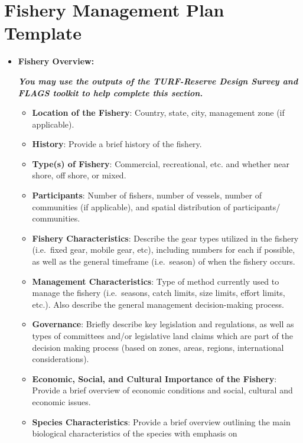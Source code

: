 \documentclass[]{book}
\begin{document}
\section{Fishery Management Plan
Template}\label{fishery-management-plan-template}

\begin{itemize}
\item
  \textbf{Fishery Overview:}

  \textbf{\emph{You may use the outputs of the TURF-Reserve Design
  Survey and FLAGS toolkit to help complete this section.}}

  \begin{itemize}
  \item
    \textbf{Location of the Fishery}: Country, state, city, management
    zone (if applicable).
  \item
    \textbf{History}: Provide a brief history of the fishery.
  \item
    \textbf{Type(s) of Fishery}: Commercial, recreational, etc. and
    whether near shore, off shore, or mixed.
  \item
    \textbf{Participants}: Number of fishers, number of vessels, number
    of communities (if applicable), and spatial distribution of
    participants/ communities.
  \item
    \textbf{Fishery Characteristics}: Describe the gear types utilized
    in the fishery (i.e.~fixed gear, mobile gear, etc), including
    numbers for each if possible, as well as the general timeframe
    (i.e.~season) of when the fishery occurs.
  \item
    \textbf{Management Characteristics}: Type of method currently used
    to manage the fishery (i.e.~seasons, catch limits, size limits,
    effort limits, etc.). Also describe the general management
    decision-making process.
  \item
    \textbf{Governance}: Briefly describe key legislation and
    regulations, as well as types of committees and/or legislative land
    claims which are part of the decision making process (based on
    zones, areas, regions, international considerations).
  \item
    \textbf{Economic, Social, and Cultural Importance of the Fishery}:
    Provide a brief overview of economic conditions and social, cultural
    and economic issues.
  \item
    \textbf{Species Characteristics}: Provide a brief overview outlining
    the main biological characteristics of the species with emphasis on

\end{itemize}
\end{itemize}
\end{document}
